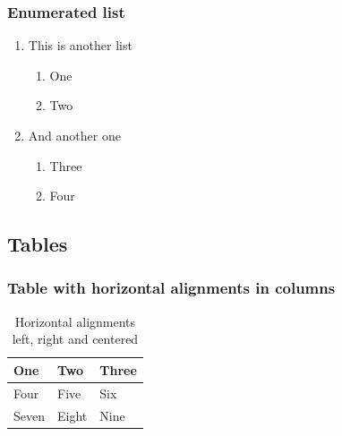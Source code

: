 \documentclass{article}
\begin{document}
        \subsubsection{Enumerated list}
        \begin{enumerate}
            \item This is another list
            \begin{enumerate}
                \item One 
                \item Two
            \end{enumerate}
            \item And another one
            \begin{enumerate}
                \item Three
                \item Four
            \end{enumerate}
        \end{enumerate}

    \newpage
    \subsection{Tables}
        \subsubsection{Table with horizontal alignments in columns}
            \begin{table}[!h]
                \begin{tabularx} {0.5\textwidth} {
                    | >{\raggedright\arraybackslash}X 
                    | >{\centering\arraybackslash}X 
                    | >{\raggedleft\arraybackslash}X | }
                    \hline
                    One & Two & Three \\ \hline
                    Four & Five & Six \\ \hline
                    Seven & Eight & Nine \\ \hline
                \end{tabularx}
                \centering
                \caption{Horizontal alignments left, right and centered}
                \label{table:numbers}
            \end{table}
            \FloatBarrier
            
\end{document}
